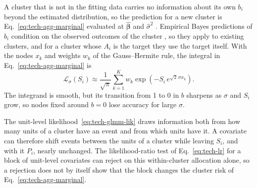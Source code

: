A cluster that is not in the fitting data carries no information about its own $b_i$ beyond the estimated distribution, so the prediction for a new cluster is Eq.~\eqref{eq:tech-agg-marginal} evaluated at $\hat{\boldsymbol{\beta}}$ and $\hat{\sigma}^2$ \cite{pavlou2015marginal, skrondal2009prediction}.
Empirical Bayes predictions of $b_i$ condition on the observed outcomes of the cluster \cite{skrondal2009prediction}, so they apply to existing clusters, and for a cluster whose $A_i$ is the target they use the target itself.
With the nodes $x_k$ and weights $w_k$ of the Gauss--Hermite rule, the integral in Eq.~\eqref{eq:tech-agg-marginal} is
\begin{equation}
  \mathcal{L}_\sigma(S_i) \approx \frac{1}{\sqrt{\pi}} \sum_{k=1}^{K} w_k \exp\!\left(-S_i\, e^{\sqrt{2}\,\sigma x_k}\right) .
  \label{eq:tech-agg-gh}
\end{equation}
The integrand is smooth, but its transition from 1 to 0 in $b$ sharpens as $\sigma$ and $S_i$ grow, so nodes fixed around $b = 0$ lose accuracy for large $\sigma$.

The unit-level likelihood~\eqref{eq:tech-glmm-lik} draws information both from how many units of a cluster have an event and from which units have it.
A covariate can therefore shift events between the units of a cluster while leaving $S_i$, and with it $P_i$, nearly unchanged.
The likelihood-ratio test of Eq.~\eqref{eq:tech-lr} for a block of unit-level covariates can reject on this within-cluster allocation alone, so a rejection does not by itself show that the block changes the cluster risk of Eq.~\eqref{eq:tech-agg-marginal}.
